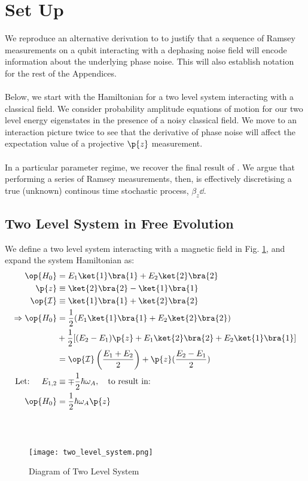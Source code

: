 \section{Set Up}\label{sec:ap_setup}
 We reproduce an alternative derivation to \cite{soare} to justify that a sequence of Ramsey measurements on a qubit interacting with a dephasing noise field will encode information about the underlying phase noise. This will also establish notation for the rest of the Appendices. 
 \\
 \\
Below, we start with the Hamiltonian for a two level system interacting with a classical field. We consider probability amplitude equations of motion for our two level energy eigenstates in the presence of a noisy classical field. We move to an interaction picture twice to see that the derivative of phase noise will affect the expectation value of a projective $\p{z}$ measurement. 
\\
\\
In a particular parameter regime, we recover the final result of \cite{soare}. We argue that performing a series of Ramsey measurements, then, is effectively discretising a true (unknown) continous time stochastic process, $\beta_z \dd $.

\subsection{Two Level System in Free Evolution}

We define a two level system interacting with a magnetic field in Fig. \ref{fig:set_up}, and expand the system Hamiltonian as: 
\\
\begin{align}
\op{H_0} &= E_1\ket{1}\bra{1} + E_2\ket{2}\bra{2} \\
\p{z} &\equiv \ket{2}\bra{2} - \ket{1}\bra{1} \\
\op{\mathcal{I}} & \equiv \ket{1}\bra{1} + \ket{2}\bra{2} \\
\Rightarrow \op{H_0} & = \frac{1}{2} (E_1\ket{1}\bra{1}+ E_2\ket{2}\bra{2}) \\
& + \frac{1}{2} [(E_2 - E_1)\p{z} + E_1 \ket{2}\bra{2} + E_2 \ket{1}\bra{1}]\\
& = \op{\mathcal{I}} \left( \frac{E_1 + E_2}{2} \right) + \p{z}(\frac{E_2 - E_1}{2}) \\
\text{Let: } \quad E_{1,2} &\equiv \mp \frac{1}{2} \hbar \omega_A, \quad \text{to result in:} \\
\op{H_0} &= \frac{1}{2} \hbar \omega_A \p{z}
\end{align}
\\
\\
\begin{figure}[h]
	\centering
	\texttt{[image: two\_level\_system.png]}
	\caption[Setup: Diagram of Two Level System]{Diagram of Two Level System}
	\label{fig:set_up}
\end{figure}
\\
\\
